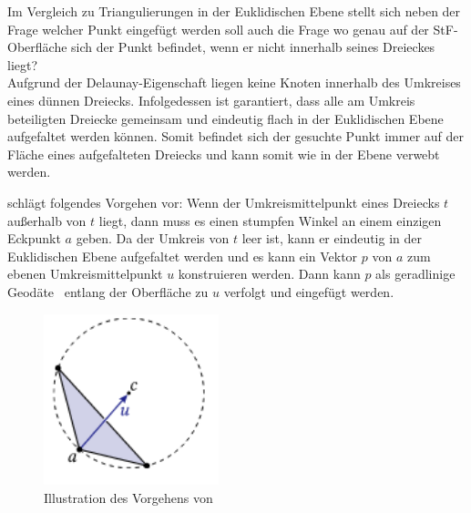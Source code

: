 Im Vergleich zu Triangulierungen in der Euklidischen Ebene stellt sich neben der Frage welcher Punkt eingefügt werden soll auch die Frage wo genau auf der StF-Oberfläche sich der Punkt befindet, wenn er nicht innerhalb seines Dreieckes liegt? \\

Aufgrund der Delaunay-Eigenschaft liegen keine Knoten innerhalb des Umkreises eines dünnen Dreiecks. Infolgedessen ist  garantiert, dass alle am Umkreis beteiligten Dreiecke gemeinsam und eindeutig flach in der Euklidischen Ebene aufgefaltet werden können. Somit befindet sich der gesuchte Punkt immer auf der Fläche eines aufgefalteten Dreiecks und kann somit wie in der Ebene verwebt werden. 


\citet{Sharp:2019:NIT} schlägt folgendes Vorgehen vor:
Wenn der Umkreismittelpunkt eines Dreiecks $t$ außerhalb von
$t$ liegt, dann muss es einen stumpfen Winkel an einem einzigen
Eckpunkt $a$ geben. Da der Umkreis von $t$ leer ist, kann er
eindeutig in der Euklidischen Ebene aufgefaltet werden  und es kann ein Vektor $p$ von $a$ zum ebenen Umkreismittelpunkt $u$ konstruieren werden. Dann kann $p$ als geradlinige Geodäte~\cite{Polthier:2006:SIGGRAPH} entlang der Oberfläche zu $u$ verfolgt und eingefügt werden.

 \begin{figure}[h]
    \centering
    \includegraphics[width=2in]{images/auffaltung_punkteinfuegen.png}
    \caption{Illustration des Vorgehens von~\citeauthor{Sharp:2019:NIT} \cite{Sharp:2019:NIT} }%
    \label{fig:auffaltung_Punkt_einfügen}
\end{figure}
